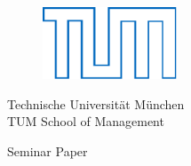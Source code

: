 \thispagestyle{empty}
\selectfont
\vspace{1.5cm}

\begin{figure}[h]
\begin{center}
\includegraphics[width=4cm]{images/tum.pdf}
\end{center}
\end{figure}

\begin{center}
\LARGE
Technische Universit\"at M\"unchen\\
\vspace{1.8cm}
TUM School of Management
\normalsize
\end{center}
\vspace{1cm}

\begin{center}
\LARGE 
\textbf{\placetitle}
\normalsize
\end{center}
\vspace{1cm}

\begin{center}
\Large
Seminar Paper
\normalsize
\end{center}

\vspace{1cm}

